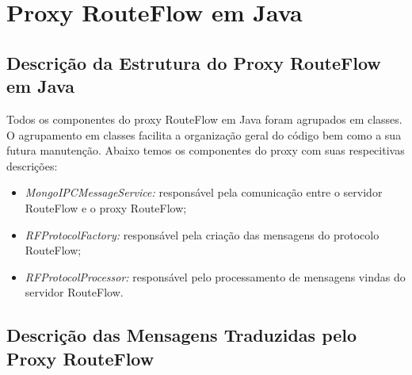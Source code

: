 \chapter{Proxy RouteFlow em Java}

\section{Descrição da Estrutura do Proxy RouteFlow em Java}

Todos os componentes do proxy RouteFlow em Java foram agrupados em classes. O agrupamento em classes facilita a 
organização geral do código bem como a sua futura manutenção. Abaixo temos os componentes do proxy com suas respecitivas
descrições:

\begin{itemize}
\item \textit{MongoIPCMessageService:} responsável pela comunicação entre o servidor RouteFlow e o proxy RouteFlow;
\item \textit{RFProtocolFactory:} responsável pela criação das mensagens do protocolo RouteFlow;
\item \textit{RFProtocolProcessor:} responsável pelo processamento de mensagens vindas do servidor RouteFlow.
\end{itemize} 

\section{Descrição das Mensagens Traduzidas pelo Proxy RouteFlow}

